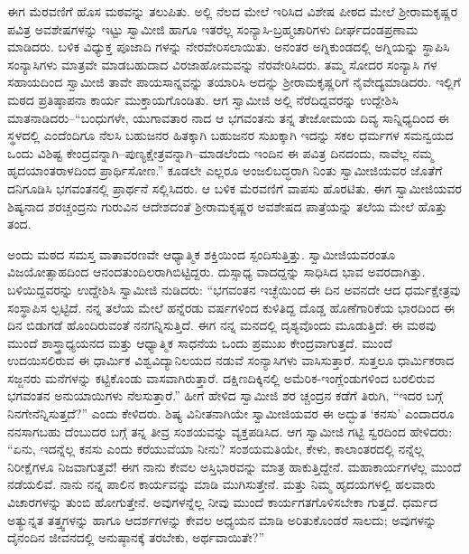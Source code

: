 ಈಗ ಮೆರವಣಿಗೆ ಹೊಸ ಮಠವನ್ನು ತಲುಪಿತು. ಅಲ್ಲಿ ನೆಲದ ಮೇಲೆ ಇರಿಸಿದ ವಿಶೇಷ ಪೀಠದ ಮೇಲೆ ಶ್ರೀರಾಮಕೃಷ್ಣರ ಪವಿತ್ರ ಅವಶೇಷಗಳನ್ನು ಇಟ್ಟು ಸ್ವಾಮೀಜಿ ಹಾಗೂ ಇತರೆಲ್ಲ ಸಂನ್ಯಾಸಿ-ಬ್ರಹ್ಮಚಾರಿಗಳು ದೀರ್ಘದಂಡಪ್ರಣಾಮ ಮಾಡಿದರು. ಬಳಿಕ ವಿಧ್ಯುಕ್ತ ಪೂಜಾದಿ ಗಳನ್ನು ನೇರವೇರಿಸಲಾಯಿತು. ಅನಂತರ ಅಗ್ನಿಕುಂಡದಲ್ಲಿ ಅಗ್ನಿಯನ್ನು ಸ್ಥಾಪಿಸಿ ಸಂನ್ಯಾಸಿಗಳು ಮಾತ್ರವೇ ಮಾಡಬಹುದಾದ ವಿರಜಾಹೋಮವನ್ನು ನೆರವೇರಿಸಿದರು. ತಮ್ಮ ಸೋದರ ಸಂನ್ಯಾಸಿ ಗಳ ಸಹಾಯದಿಂದ ಸ್ವಾಮೀಜಿ ತಾವೇ ಪಾಯಸಾನ್ನವನ್ನು ತಯಾರಿಸಿ ಅದನ್ನು ಶ್ರೀರಾಮಕೃಷ್ಣರಿಗೆ ನೈವೇದ್ಯಮಾಡಿದರು. ಇಲ್ಲಿಗೆ ಮಠದ ಪ್ರತಿಷ್ಠಾಪನಾ ಕಾರ್ಯ ಮುಕ್ತಾಯಗೊಂಡಿತು. ಆಗ ಸ್ವಾಮೀಜಿ ಅಲ್ಲಿ ನೆರೆದಿದ್ದವರನ್ನು ಉದ್ದೇಶಿಸಿ ಮಾತನಾಡಿದರು–“ಬಂಧುಗಳೇ, ಯುಗಾವತಾರ ನಾದ ಆ ಭಗವಂತನು ತನ್ನ ತೇಜೋಮಯ ದಿವ್ಯ ಸಾನ್ನಿಧ್ಯದಿಂದ ಈ ಸ್ಥಳದಲ್ಲಿ ಎಂದೆಂದಿಗೂ ನೆಲಸಿ ಬಹುಜನರ ಹಿತಕ್ಕಾಗಿ ಬಹುಜನರ ಸುಖಕ್ಕಾಗಿ ಇದನ್ನು ಸಕಲ ಧರ್ಮಗಳ ಸಮನ್ವಯದ ಒಂದು ವಿಶಿಷ್ಟ ಕೇಂದ್ರವನ್ನಾಗಿ–ಪುಣ್ಯಕ್ಷೇತ್ರವನ್ನಾಗಿ–ಮಾಡಲೆಂದು ಇಂದಿನ ಈ ಪವಿತ್ರ ದಿನದಂದು, ನಾವೆಲ್ಲ ನಮ್ಮ ಹೃದಯಾಂತರಾಳದಿಂದ ಪ್ರಾರ್ಥಿಸೋಣ.” ಕೂಡಲೇ ಎಲ್ಲರೂ ಅಂಜಲಿಬದ್ಧರಾಗಿ ನಿಂತು ಸ್ವಾಮೀಜಿಯವರ ಜೊತೆಗೆ ದನಿಗೂಡಿಸಿ ಭಗವಂತನಲ್ಲಿ ಪ್ರಾರ್ಥನೆ ಸಲ್ಲಿಸಿದರು. ಆ ಬಳಿಕ ಮೆರವಣಿಗೆ ವಾಪಸು ಹೊರಟಿತು. ಈಗ ಸ್ವಾಮೀಜಿಯವರ ಶಿಷ್ಯನಾದ ಶರಚ್ಚಂದ್ರನು ಗುರುವಿನ ಆದೇಶದಂತೆ ಶ್ರೀರಾಮಕೃಷ್ಣರ ಅವಶೇಷದ ಪಾತ್ರೆಯನ್ನು ತಲೆಯ ಮೇಲೆ ಹೊತ್ತು ತಂದ.

ಅಂದು ಮಠದ ಸಮಸ್ತ ವಾತಾವರಣವೇ ಆಧ್ಯಾತ್ಮಿಕ ಶಕ್ತಿಯಿಂದ ಸ್ಪಂದಿಸುತ್ತಿತ್ತು. ಸ್ವಾಮೀಜಿಯವರಂತೂ ವಿಜಯೋತ್ಸಾಹದಿಂದ ಆನಂದತುಂದಿಲರಾಗಿಬಿಟ್ಟಿದ್ದರು. ದುಸ್ಸಾಧ್ಯ ವಾದದ್ದನ್ನು ಸಾಧಿಸಿದ ಭಾವ ಅವರದಾಗಿತ್ತು. ಬಳಿಯಿದ್ದವರನ್ನು ಉದ್ದೇಶಿಸಿ ಸ್ವಾಮೀಜಿ ನುಡಿದರು: “ಭಗವಂತನ ಇಚ್ಛೆಯಿಂದ ಈ ದಿನ ಅವನದೇ ಆದ ಧರ್ಮಕ್ಷೇತ್ರವು ಸಂಸ್ಥಾಪಿಸ ಲ್ಪಟ್ಟಿದೆ. ನನ್ನ ತಲೆಯ ಮೇಲೆ ಹನ್ನೆರಡು ವರ್ಷಗಳಿಂದ ಕುಳಿತಿದ್ದ ದೊಡ್ಡ ಹೊಣೆಗಾರಿಕೆಯ ಭಾರದಿಂದ ಈ ದಿನ ಬಿಡುಗಡೆ ಹೊಂದಿರುವಂತೆ ನನಗನ್ನಿಸುತ್ತಿದೆ. ಈಗ ನನ್ನ ಮನದಲ್ಲಿ ದೃಶ್ಯವೊಂದು ಮೂಡುತ್ತಿದೆ: ಈ ಮಠವು ಮುಂದೆ ಶಾಸ್ತ್ರಾಧ್ಯಯನದ ಮತ್ತು ಆಧ್ಯಾತ್ಮಿಕ ಸಾಧನೆಯ ಒಂದು ಪ್ರಮುಖ ಕೇಂದ್ರವಾಗುತ್ತದೆ. ಮುಂದೆ ಉದಯಿಸಲಿರುವ ಈ ಧಾರ್ಮಿಕ ವಿಶ್ವವಿದ್ಯಾನಿಲಯದ ನಡುವೆ ಸಂನ್ಯಾಸಿಗಳು ವಾಸಿಸುತ್ತಾರೆ. ಸುತ್ತಲೂ ಧಾರ್ಮಿಕರಾದ ಸಜ್ಜನರು ಮನೆಗಳನ್ನು ಕಟ್ಟಿಕೊಂಡು ವಾಸವಾಗಿರುತ್ತಾರೆ. ದಕ್ಷಿಣದಿಕ್ಕಿನಲ್ಲಿ ಅಮೆರಿಕ-ಇಂಗ್ಲೆಂಡುಗಳಿಂದ ಬರಲಿರುವ ಭಗವಂತನ ಅನುಯಾಯಿಗಳು ನೆಲಸುತ್ತಾರೆ.” ಹೀಗೆ ಹೇಳಿದ ಸ್ವಾಮೀಜಿ ಶರ ಚ್ಚಂದ್ರನ ಕಡೆಗೆ ತಿರುಗಿ, “ಇದರ ಬಗ್ಗೆ ನಿನಗೇನೆನ್ನಿಸುತ್ತದೆ?” ಎಂದು ಕೇಳಿದರು. ಶಿಷ್ಯ ವಿನೀತನಾಗಿಯೇ ಸ್ವಾಮೀಜಿಯವರ ಈ ಅದ್ಭುತ ‘ಕನಸು’ ಎಂದಾದರೂ ನನಸಾಗಬಹು ದೆಂಬುದರ ಬಗ್ಗೆ ತನ್ನ ತೀವ್ರ ಸಂಶಯವನ್ನು ವ್ಯಕ್ತಪಡಿಸಿದ. ಆಗ ಸ್ವಾಮೀಜಿ ಗಟ್ಟಿ ಸ್ವರದಿಂದ ಹೇಳಿದರು: “ಏನು, ಇದನ್ನೆಲ್ಲ ಕನಸು ಎಂದು ಕರೆಯುವೆಯಾ ನೀನು? ಸಂಶಯಮತಿಯೇ, ಕೇಳು, ಕಾಲಾಂತರದಲ್ಲಿ ನನ್ನೆಲ್ಲ ನಿರೀಕ್ಷೆಗಳೂ ನಿಜವಾಗುತ್ತವೆ! ಈಗ ನಾನು ಕೇವಲ ಅಸ್ತಿಭಾರವನ್ನು ಮಾತ್ರ ಹಾಕುತ್ತಿದ್ದೇನೆ. ಮಹಾಕಾರ್ಯಗಳೆಲ್ಲ ಮುಂದೆ ನಡೆಯಲಿವೆ. ನಾನು ನನ್ನ ಪಾಲಿನ ಕಾರ್ಯವನ್ನು ಮಾಡಿ ಮುಗಿಸುತ್ತೇನೆ. ಮತ್ತು ನಿಮ್ಮ ಹೃದಯಗಳಲ್ಲಿ ಹಲವಾರು ವಿಚಾರಗಳನ್ನು ತುಂಬಿ ಹೋಗುತ್ತೇನೆ. ಅವುಗಳನ್ನೆಲ್ಲ ನೀವು ಮುಂದೆ ಕಾರ್ಯಗತಗೊಳಿಸಬೇಕಾ ಗುತ್ತದೆ. ಧರ್ಮದ ಅತ್ಯುನ್ನತ ತತ್ತ್ವಗಳನ್ನು ಹಾಗೂ ಆದರ್ಶಗಳನ್ನು ಕೇವಲ ಅಧ್ಯಯನ ಮಾಡಿ ಅರಿತುಕೊಂಡರೆ ಸಾಲದು; ಅವುಗಳನ್ನು ದೈನಂದಿನ ಜೀವನದಲ್ಲಿ ಅನುಷ್ಠಾನಕ್ಕೆ ತರಬೇಕು, ಅರ್ಥವಾಯಿತೇ?”

